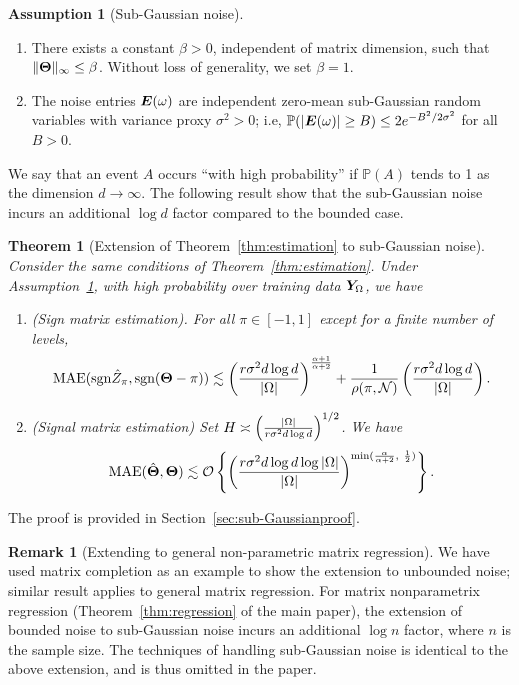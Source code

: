 \documentclass[11pt]{article}
\theoremstyle{plain}
\newtheorem{thm}{Theorem}[section]
\theoremstyle{definition}
\newtheorem{assumption}{Assumption}
\newtheorem{rmk}{Remark}
\def\sign{\textup{sgn}}
\begin{document}
\begin{assumption}[Sub-Gaussian noise]\label{assm:subg}\hfill

\begin{enumerate}
\item There exists a constant $\beta>0$, independent of matrix dimension, such that $\|\bm{\Theta}\|_\infty\leq \beta$. Without loss of generality, we set $\beta = 1$.
\item The noise entries $\bm{E}(\omega)$ are independent zero-mean sub-Gaussian random variables with variance proxy $\sigma^2>0$; i.e, $\mathbb{P}(|\bm{E}(\omega)|\geq B)\leq 2e^{-B^2/2\sigma^2}$ for all $B>0$.  
\end{enumerate}
\end{assumption}

We say that an event $A$ occurs ``with high probability'' if $\mathbb{P}(A)$ tends to 1 as the dimension $d\to \infty$. The following result show that the sub-Gaussian noise incurs an additional $\log d$ factor compared to the bounded case. 

\begin{thm}[Extension of Theorem~\ref{thm:estimation} to sub-Gaussian noise]\label{thm:extension_gaussian} Consider the same conditions of Theorem~\ref{thm:estimation}. Under Assumption~\ref{assm:subg}, with high probability over training data $\bm Y_{\Omega}$, we have
\begin{enumerate}
\item [(a)](Sign matrix estimation). For all $\pi\in [-1,1]$ except for a finite number of levels,
\begin{equation}\label{eq:matrix_sign}
 \textup{MAE}(\sign \hat Z_\pi,\sign (\mTheta-\pi))\lesssim \left({r \sigma^2d\log d \over |\Omega|}\right)^{\alpha+1\over \alpha+2}+{1\over \rho(\pi,\tN)}\left({r \sigma^2d\log d \over |\Omega|}\right).
\end{equation}
\item [(b)](Signal matrix estimation) Set $H\asymp \left({ |\Omega|\over r \sigma^2d\log d}\right)^{1/2}$. We have
\[
 \textup{MAE}(\hat \mTheta,\mTheta)\lesssim \tO\left\{\left({r \sigma^2d\log d\log|\Omega|\over |\Omega|}\right)^{\min({\alpha\over\alpha+2},\ \frac{1}{2})}\right\}.
\]
\end{enumerate}
\end{thm}
The proof is provided in Section~\ref{sec:sub-Gaussianproof}.  

\begin{rmk}[Extending to general non-parametric matrix regression] We have used matrix completion as an example to show the extension to unbounded noise; similar result applies to general matrix regression. 
For matrix nonparametrix regression (Theorem~\ref{thm:regression} of the main paper), the extension of bounded noise to sub-Gaussian noise incurs an additional $\log n$ factor, where $n$ is the sample size. The techniques of handling sub-Gaussian noise is identical to the above extension, and is thus omitted in the paper. 
\end{rmk}
\end{document}
